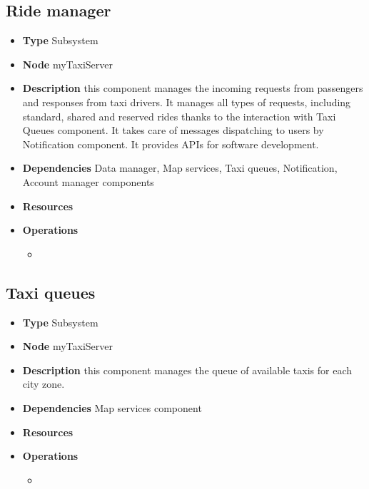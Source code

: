 \subsection{Ride manager}
\begin{itemize}
	\item[]\textbf{Type} Subsystem
	\item[]\textbf{Node} myTaxiServer
	\item[]\textbf{Description} this component manages the incoming requests from passengers and responses from taxi drivers. It manages all types of requests, including standard, shared and reserved rides thanks to the interaction with Taxi Queues component. It takes care of messages dispatching to users by Notification component. It provides APIs for software development.
	\item[]\textbf{Dependencies} Data manager, Map services, Taxi queues, Notification, Account manager components
	\item[]\textbf{Resources} 
	\item[]\textbf{Operations}\begin{itemize}
		\item
	\end{itemize}
\end{itemize}

\subsection{Taxi queues}
\begin{itemize}
	\item[]\textbf{Type} Subsystem
	\item[]\textbf{Node} myTaxiServer
	\item[]\textbf{Description} this component manages the queue of available taxis for each city zone.
	\item[]\textbf{Dependencies} Map services component
	\item[]\textbf{Resources}
	\item[]\textbf{Operations} \begin{itemize}
		\item
	\end{itemize}
\end{itemize}

